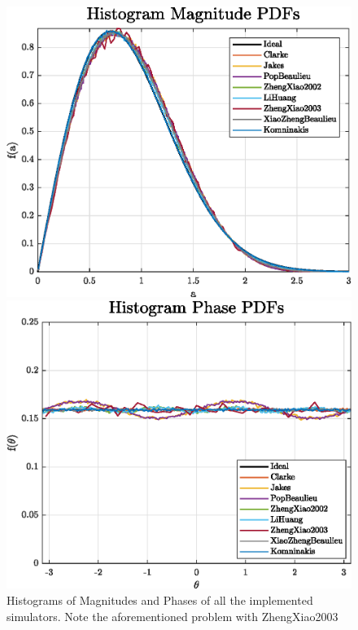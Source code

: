 \begin{figure}
\hfill
\begin{minipage}{.49\linewidth}
	\includegraphics[width=\linewidth]{img/histMag.eps}
\end{minipage}
\hfill
\begin{minipage}{.49\linewidth}
	\includegraphics[width=\linewidth]{img/histPhase.eps}
\end{minipage}
\hfill

\caption{Histograms of Magnitudes and Phases of all the implemented simulators. Note the aforementioned problem with ZhengXiao2003}
\label{fig:histograms}
\end{figure}

